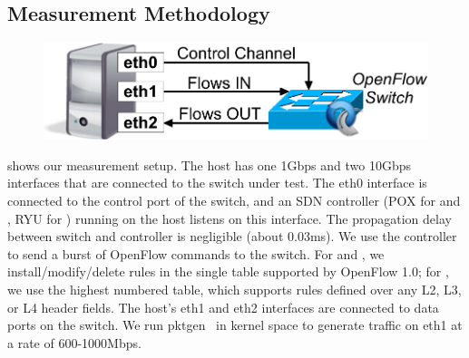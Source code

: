 \subsection{Measurement Methodology}

\begin{figure}[!tb]
\centering
\includegraphics[width=0.7\columnwidth]{figs/experiment_setup.pdf}
\label{experiment_setup} 
\end{figure}

 shows our measurement setup.
The host has one 1Gbps and two 10Gbps interfaces that are connected to the switch under test. 
The eth0 interface is connected to the control port of the switch, and an SDN
controller (POX for \Intel and \BroadcomOne, RYU for \BroadcomThree) running
on the host listens on this interface. 
The propagation delay between switch and controller is
negligible (about 0.03ms). We use the controller to send a burst of OpenFlow 
\flowmod commands to the switch. For \Intel and \BroadcomOne, we
install/modify/delete rules in the single table supported by OpenFlow 1.0;
for \BroadcomThree, we use the highest numbered table, which supports
rules defined over any L2, L3, or L4 header fields.
The host's eth1 and eth2 interfaces are connected to data ports on the
switch. We run pktgen~\cite{pktgen} in kernel space to generate traffic on
eth1 at a rate of 600-1000Mbps.

